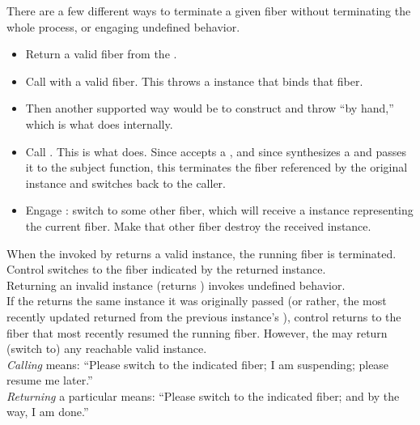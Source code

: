 
There are a few different ways to terminate a given fiber without
terminating the whole process, or engaging undefined behavior.

\begin{itemize}
    \item Return a valid fiber from the \entryfn.
    \item Call \unwindfib with a valid fiber. This throws a \unwindex
          instance that binds that fiber.
    \item Then another supported way would be to construct and throw \unwindex
          ``by hand,'' which is what \unwindfib does internally.
    \item Call .
          This is what \dtor does. Since \unwindfib accepts a \fiber, and
          since \resumewith synthesizes a \fiber and passes it to the subject
          function, this terminates the fiber referenced by the original
          \fiber instance and switches back to the caller.
    \item Engage \dtor: switch to some other fiber, which will
          receive a \fiber instance representing the current fiber. Make that
          other fiber destroy the received \fiber instance.
\end{itemize}

When the \entryfn\xspace invoked by \resume returns a valid \fiber instance, the
running fiber is terminated. Control switches to the fiber indicated by the
returned \fiber instance.\\

Returning an invalid \fiber instance (\opbool returns ) invokes
undefined behavior.\\

If the \entryfn\xspace returns the same \fiber instance it was originally passed
(or rather, the most recently updated \fiber returned from the previous
instance's \resume), control returns to the fiber that most recently resumed the
running fiber. However, the \entryfn\xspace may return (switch to) any reachable
valid \fiber instance.\\

\emph{Calling} \resume means: ``Please switch to the indicated fiber; I
am suspending; please resume me later.''\\

\emph{Returning} a particular \fiber means: ``Please switch to the indicated
fiber; and by the way, I am done.''

